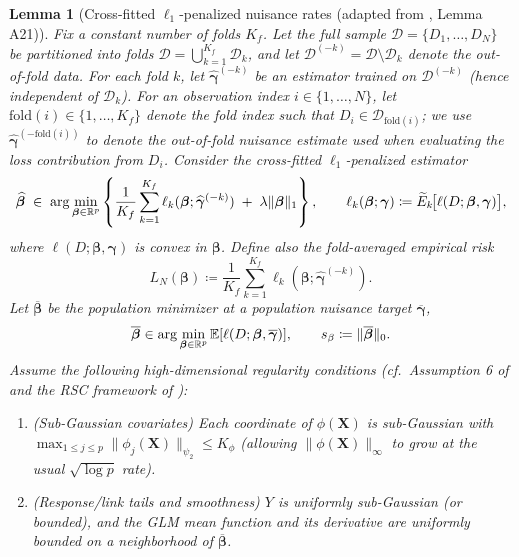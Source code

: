 \documentclass{article}
\newtheorem{lemma}[theorem]{Lemma}
\begin{document}
\begin{lemma}[Cross-fitted $\ell_1$-penalized nuisance rates (adapted from \citet{hou2025efficient}, Lemma A21)]\label{lem:nuisance_rates}
Fix a constant number of folds $K_f$. Let the full sample $\mathcal{D}=\{D_1,\ldots,D_N\}$ be partitioned into folds $\mathcal{D}=\bigcup_{k=1}^{K_f}\mathcal{D}_k$, and let $\mathcal{D}^{(-k)}=\mathcal{D}\setminus\mathcal{D}_k$ denote the out-of-fold data. For each fold $k$, let $\widehat{\boldsymbol{\gamma}}^{(-k)}$ be an estimator trained on $\mathcal{D}^{(-k)}$ (hence independent of $\mathcal{D}_k$).
For an observation index $i\in\{1,\ldots,N\}$, let $\mathrm{fold}(i)\in\{1,\ldots,K_f\}$ denote the fold index such that $D_i\in\mathcal{D}_{\mathrm{fold}(i)}$; we use $\widehat{\boldsymbol{\gamma}}^{(-\mathrm{fold}(i))}$ to denote the out-of-fold nuisance estimate used when evaluating the loss contribution from $D_i$.
Consider the cross-fitted $\ell_1$-penalized estimator
\[
\widehat{\boldsymbol{\beta}}
\;\in\;
\arg\min_{\boldsymbol{\beta}\in\mathbb{R}^p}
\left\{
\frac{1}{K_f}\sum_{k=1}^{K_f}\ell_k(\boldsymbol{\beta};\widehat{\boldsymbol{\gamma}}^{(-k)})
\;+\;
\lambda\|\boldsymbol{\beta}\|_1
\right\},
\qquad
\ell_k(\boldsymbol{\beta};\boldsymbol{\gamma})
\coloneqq
\widetilde{E}_k\!\big[\ell(D;\boldsymbol{\beta},\boldsymbol{\gamma})\big],
\]
where $\ell(D;\boldsymbol{\beta},\boldsymbol{\gamma})$ is convex in $\boldsymbol{\beta}$.
Define also the fold-averaged empirical risk
\[
L_N(\boldsymbol{\beta}) \coloneqq \frac{1}{K_f}\sum_{k=1}^{K_f}\ell_k(\boldsymbol{\beta};\widehat{\boldsymbol{\gamma}}^{(-k)}).
\]
Let $\overline{\boldsymbol{\beta}}$ be the population minimizer at a population nuisance target $\overline{\boldsymbol{\gamma}}$,
\[
\overline{\boldsymbol{\beta}}\in\arg\min_{\boldsymbol{\beta}\in\mathbb{R}^p}\operatorname{\mathbb{E}}[\ell(D;\boldsymbol{\beta},\overline{\boldsymbol{\gamma}})],
\qquad s_\beta\coloneqq\|\overline{\boldsymbol{\beta}}\|_0.
\]
Assume the following high-dimensional regularity conditions (cf.\ Assumption 6 of \citet{hou2025efficient} and the RSC framework of \citet{negahban2012unified}):
\begin{enumerate}
    \item[(a)] (Sub-Gaussian covariates) Each coordinate of $\phi(\boldsymbol{X})$ is sub-Gaussian with $\max_{1\le j\le p}\|\phi_j(\boldsymbol{X})\|_{\psi_2}\le K_\phi$ (allowing $\|\phi(\boldsymbol{X})\|_\infty$ to grow at the usual $\sqrt{\log p}$ rate).
    \item[(b)] (Response/link tails and smoothness) $Y$ is uniformly sub-Gaussian (or bounded), and the GLM mean function and its derivative are uniformly bounded on a neighborhood of $\overline{\boldsymbol{\beta}}$.

\end{enumerate}
\end{lemma}
\end{document}

